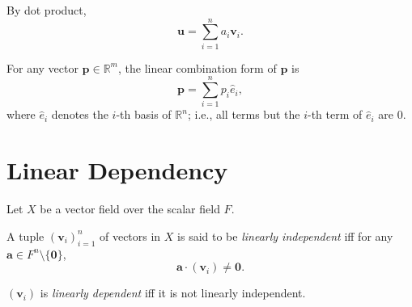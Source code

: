 \begin{note}
	By dot product,
	$$
	\mathbf u = \sum_{i = 1}^n a_i \mathbf v_i.
	$$
\end{note}


\begin{note}
	For any vector $\mathbf p \in \mathbb R^m$, the linear combination form of $\mathbf p$ is
	$$
	\mathbf p = \sum_{i = 1}^n p_i \hat e_i,
	$$
	where $\hat e_i$ denotes the $i$-th basis of $\mathbb R^n$; i.e., all terms but the $i$-th term of $\hat e_i$ are $0$.
\end{note}





\section{Linear Dependency}



\begin{definition}
	\label{def: linear dependency}
	Let $X$ be a vector field over the scalar field $F$.
	
	A tuple $(\mathbf v_i)_{i = 1}^n$ of vectors in $X$ is said to be \textit{linearly independent} iff for any $\mathbf a \in F^n \setminus \{\mathbf 0\}$,
	$$
	\mathbf a \cdot (\mathbf v_i) \ne \mathbf 0.
	$$
	
	$(\mathbf v_i)$ is \textit{linearly dependent} iff it is not linearly independent.
\end{definition}













































%